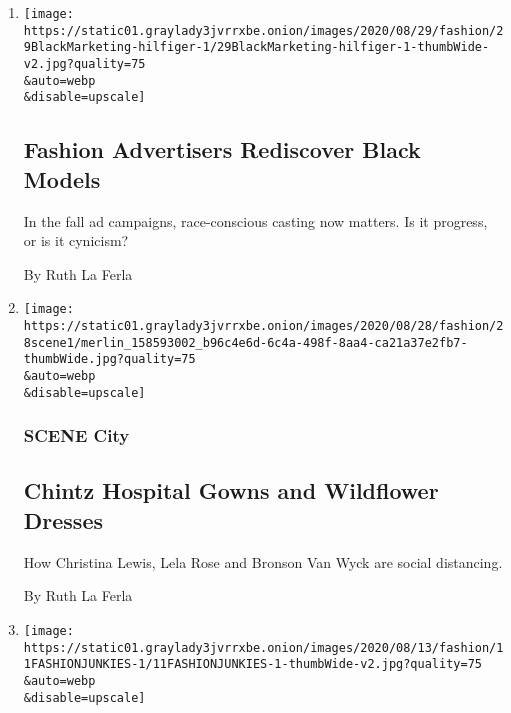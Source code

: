 \begin{enumerate}
\def\labelenumi{\arabic{enumi}.}
\item
  \href{/2020/08/29/style/black-models-fashion-advertising.html}{}

  \texttt{[image: https://static01.graylady3jvrrxbe.onion/images/2020/08/29/fashion/29BlackMarketing-hilfiger-1/29BlackMarketing-hilfiger-1-thumbWide-v2.jpg?quality=75\\\&auto=webp\\\&disable=upscale]}

  \hypertarget{fashion-advertisers-rediscover-black-models}{%
  \subsection{Fashion Advertisers Rediscover Black
  Models}\label{fashion-advertisers-rediscover-black-models}}

  In the fall ad campaigns, race-conscious casting now matters. Is it
  progress, or is it cynicism?

  By Ruth La Ferla
\item
  \href{/2020/08/28/style/chintz-hospital-gowns-and-wildflower-dresses.html}{}

  \texttt{[image: https://static01.graylady3jvrrxbe.onion/images/2020/08/28/fashion/28scene1/merlin\_158593002\_b96c4e6d-6c4a-498f-8aa4-ca21a37e2fb7-thumbWide.jpg?quality=75\\\&auto=webp\\\&disable=upscale]}

  \hypertarget{scene-city}{%
  \subsubsection{SCENE City}\label{scene-city}}

  \hypertarget{chintz-hospital-gowns-and-wildflower-dresses}{%
  \subsection{Chintz Hospital Gowns and Wildflower
  Dresses}\label{chintz-hospital-gowns-and-wildflower-dresses}}

  How Christina Lewis, Lela Rose and Bronson Van Wyck are social
  distancing.

  By Ruth La Ferla
\item
  \href{/2020/08/11/style/leandra-medine-ari-seth-cohen-instagram-influencers.html}{}

  \texttt{[image: https://static01.graylady3jvrrxbe.onion/images/2020/08/13/fashion/11FASHIONJUNKIES-1/11FASHIONJUNKIES-1-thumbWide-v2.jpg?quality=75\\\&auto=webp\\\&disable=upscale]}


\end{enumerate}
